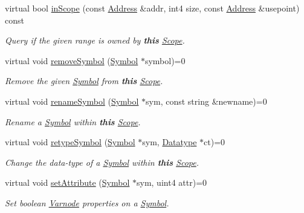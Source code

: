 \begin{DoxyCompactItemize}
virtual bool \mbox{\hyperlink{class_scope_a4fcaec6d7678dabe548680747d843a52}{in\+Scope}} (const \mbox{\hyperlink{class_address}{Address}} \&addr, int4 size, const \mbox{\hyperlink{class_address}{Address}} \&usepoint) const
\begin{DoxyCompactList}\small\item\em Query if the given range is owned by {\bfseries{this}} \mbox{\hyperlink{class_scope}{Scope}}. \end{DoxyCompactList}\item 
virtual void \mbox{\hyperlink{class_scope_a0172591847f6a1b338ad324f28732f7f}{remove\+Symbol}} (\mbox{\hyperlink{class_symbol}{Symbol}} $\ast$symbol)=0
\begin{DoxyCompactList}\small\item\em Remove the given \mbox{\hyperlink{class_symbol}{Symbol}} from {\bfseries{this}} \mbox{\hyperlink{class_scope}{Scope}}. \end{DoxyCompactList}\item 
virtual void \mbox{\hyperlink{class_scope_ab576de2e768be9507ee03faa163c1ddf}{rename\+Symbol}} (\mbox{\hyperlink{class_symbol}{Symbol}} $\ast$sym, const string \&newname)=0
\begin{DoxyCompactList}\small\item\em Rename a \mbox{\hyperlink{class_symbol}{Symbol}} within {\bfseries{this}} \mbox{\hyperlink{class_scope}{Scope}}. \end{DoxyCompactList}\item 
virtual void \mbox{\hyperlink{class_scope_afeef6a133b07fa176c08b67c44064e69}{retype\+Symbol}} (\mbox{\hyperlink{class_symbol}{Symbol}} $\ast$sym, \mbox{\hyperlink{class_datatype}{Datatype}} $\ast$ct)=0
\begin{DoxyCompactList}\small\item\em Change the data-\/type of a \mbox{\hyperlink{class_symbol}{Symbol}} within {\bfseries{this}} \mbox{\hyperlink{class_scope}{Scope}}. \end{DoxyCompactList}\item 
virtual void \mbox{\hyperlink{class_scope_a7a49f329dcfe47129bf11acac543233e}{set\+Attribute}} (\mbox{\hyperlink{class_symbol}{Symbol}} $\ast$sym, uint4 attr)=0
\begin{DoxyCompactList}\small\item\em Set boolean \mbox{\hyperlink{class_varnode}{Varnode}} properties on a \mbox{\hyperlink{class_symbol}{Symbol}}. \end{DoxyCompactList}\item 

\end{DoxyCompactItemize}
